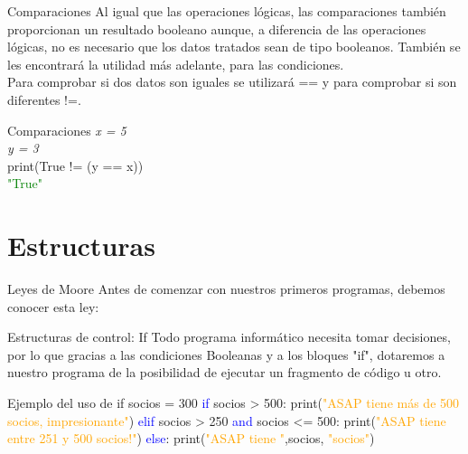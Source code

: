 \documentclass{beamer}
\begin{document}
    \begin{frame}{Comparaciones}
        Al igual que las operaciones lógicas, las comparaciones también proporcionan un resultado booleano aunque, a diferencia de las operaciones lógicas, no es necesario que los datos tratados sean de tipo booleanos. También se les encontrará la utilidad más adelante, para las condiciones.\\
        Para comprobar si dos datos son iguales se utilizará == y para comprobar si son diferentes !=.
        \begin{Programexample} {Comparaciones}
           	\centering
           	\textit{x = 5}\\
           	\textit{y = 3}\\
           	print(True != (y == x))\\
           	\textcolor{green}{"True"}
       \end{Programexample}
    \end{frame}
    
    \section{Estructuras}
    
    \begin{frame}{Leyes de Moore}
        \label{moorelaw}
       Antes de comenzar con nuestros primeros programas, debemos conocer esta ley:
    \end{frame}
    
    \begin{frame}{Estructuras de control: If}
    	Todo programa informático necesita tomar decisiones, por lo que gracias a las condiciones Booleanas y a los bloques "if", dotaremos a nuestro programa de la posibilidad de ejecutar un fragmento de código u otro.
    	\begin{Programexample} {Ejemplo del uso de if}
    		socios = 300 \newline
    		\textcolor{blue}{if} socios > 500:\newline
    		\hspace{3cm} print(\textcolor{orange}{"ASAP tiene más de 500 socios, impresionante"})\newline
    		\textcolor{blue}{elif} socios > 250 \textcolor{blue}{and} socios <= 500:\newline
    		\hspace{2cm} print(\textcolor{orange}{"ASAP tiene entre 251 y 500 socios!"})\newline
    		\textcolor{blue}{else}:\newline
    		\hspace{2cm} print(\textcolor{orange}{"ASAP tiene "},socios, \textcolor{orange}{"socios"})
    	\end{Programexample}
	\end{frame}
	
\end{document}
